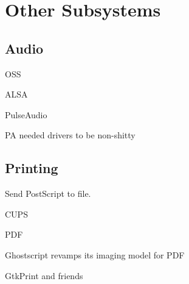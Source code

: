 \chapter{Other Subsystems}

\section{Audio}

OSS

ALSA

PulseAudio

PA needed drivers to be non-shitty

\section{Printing}

Send PostScript to file.

CUPS

PDF

Ghostscript revamps its imaging model for PDF

GtkPrint and friends
